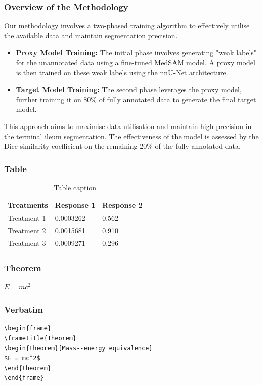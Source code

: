 \documentclass{beamer}
\begin{document}
\begin{frame}
	\frametitle{Overview of the Methodology}
	Our methodology involves a two-phased training algorithm to effectively utilise the available data and maintain segmentation precision. 
\begin{itemize}
	\item \textbf{Proxy Model Training:} The initial phase involves generating "weak labels" for the unannotated data using a fine-tuned MedSAM model. A proxy model is then trained on these weak labels using the nnU-Net architecture.
	\item \textbf{Target Model Training:} The second phase leverages the proxy model, further training it on 80\% of fully annotated data to generate the final target model.
\end{itemize}
This approach aims to maximise data utilisation and maintain high precision in the terminal ileum segmentation. The effectiveness of the model is assessed by the Dice similarity coefficient on the remaining 20\% of the fully annotated data.
\end{frame}
\begin{frame}
\frametitle{Table}
\begin{table}
\begin{tabular}{l l l}
\toprule
\textbf{Treatments} & \textbf{Response 1} & \textbf{Response 2}\\
\midrule
Treatment 1 & 0.0003262 & 0.562 \\
Treatment 2 & 0.0015681 & 0.910 \\
Treatment 3 & 0.0009271 & 0.296 \\
\bottomrule
\end{tabular}
\caption{Table caption}
\end{table}
\end{frame}
	

\begin{frame}
\frametitle{Theorem}
\begin{theorem}
$E = mc^2$
\end{theorem}
\end{frame}

	
\begin{frame}[fragile] %
\frametitle{Verbatim}
\begin{example}
\begin{verbatim}
\begin{frame}
\frametitle{Theorem}
\begin{theorem}[Mass--energy equivalence]
$E = mc^2$
\end{theorem}
\end{frame}\end{verbatim}
\end{example}
\end{frame}
\end{document}
